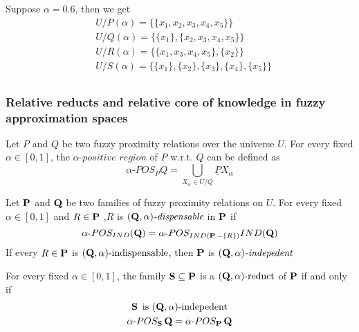\documentclass[11pt]{article}
\begin{document}
Suppose \(\alpha=0.6\), then we get
\begin{align*}
  &U/P(\alpha)=\{\{x_1,x_2,x_3,x_4,x_5\}\}\\
  &U/Q(\alpha)=\{\{x_1\},\{x_2,x_3,x_4,x_5\}\}\\
  &U/R(\alpha)=\{\{x_1,x_3,x_4,x_5\},\{x_2\}\}\\
  &U/S(\alpha)=\{\{x_1\},\{x_2\},\{x_3\},\{x_4\},\{x_5\}\}\\
\end{align*}
\subsubsection{Relative reducts and relative core of knowledge in fuzzy approximation spaces}
\label{sec:orgc73b688}
\begin{definition}[]
Let \(P\) and \(Q\) be two fuzzy proximity relations over the universe \(U\). For
every fixed \(\alpha\in[0,1]\), the \(\alpha\textit{-positive region}\) of \(P\) w.r.t. \(Q\)
can be defined as
\begin{equation*}
\alpha\text{-}POS_P Q=\displaystyle\bigcup_{X_\alpha\in U/Q} \underline{P}X_\alpha
\end{equation*}
\end{definition}
\begin{definition}[]
Let \(\operatorname{\textbf{P}}\) and \(\operatorname{\textbf{Q}}\) be two families of fuzzy proximity relations on \(U\). For
every fixed \(\alpha\in [0,1]\) and \(R\in \operatorname{\textbf{P}}\) ,\(R\) is
\((\operatorname{\textbf{Q}},\alpha)\textit{-dispensable}\) in \(\operatorname{\textbf{P}}\) if 
\begin{equation*}
\alpha\text{-}POS_{IND} (\operatorname{\textbf{Q}})=\alpha\text{-}POS_{IND(\operatorname{\textbf{P}}-\left\{ R\right\})}IND(\operatorname{\textbf{Q}})
\end{equation*}
If every \(R\in\operatorname{\textbf{P}}\) is \((\operatorname{\textbf{Q}},\alpha)\text{-indispensable}\), then \(\operatorname{\textbf{P}}\) is 
\((\operatorname{\textbf{Q}},\alpha)\textit{-indepedent}\)
\end{definition}
\begin{definition}[]
For every fixed \(\alpha\in[0,1]\), the family \(\operatorname{\textbf{S}}\subseteq\operatorname{\textbf{P}}\) is a 
\((\operatorname{\textbf{Q}},\alpha)\text{-reduct}\) of \(\operatorname{\textbf{P}}\) if and only if
\begin{gather*}
\operatorname{\textbf{S}}\text{ is } (\operatorname{\textbf{Q}},\alpha)\text{-indepedent}\\
\alpha\text{-}POS_{\operatorname{\textbf{S}}}\operatorname{\textbf{Q}}=\alpha\text{-}POS_{\operatorname{\textbf{P}}}\operatorname{\textbf{Q}}
\end{gather*}
\end{definition}
\end{document}
